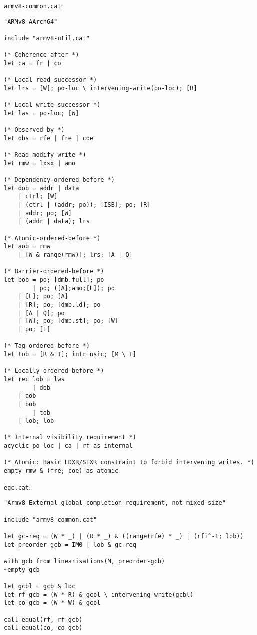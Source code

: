 \texttt{armv8-common.cat}:
\begin{verbatim}
"ARMv8 AArch64"

include "armv8-util.cat"

(* Coherence-after *)
let ca = fr | co

(* Local read successor *)
let lrs = [W]; po-loc \ intervening-write(po-loc); [R]

(* Local write successor *)
let lws = po-loc; [W]

(* Observed-by *)
let obs = rfe | fre | coe

(* Read-modify-write *)
let rmw = lxsx | amo

(* Dependency-ordered-before *)
let dob = addr | data
	| ctrl; [W]
	| (ctrl | (addr; po)); [ISB]; po; [R]
	| addr; po; [W]
	| (addr | data); lrs

(* Atomic-ordered-before *)
let aob = rmw
	| [W & range(rmw)]; lrs; [A | Q]

(* Barrier-ordered-before *)
let bob = po; [dmb.full]; po
        | po; ([A];amo;[L]); po
	| [L]; po; [A]
	| [R]; po; [dmb.ld]; po
	| [A | Q]; po
	| [W]; po; [dmb.st]; po; [W]
	| po; [L]

(* Tag-ordered-before *)
let tob = [R & T]; intrinsic; [M \ T]

(* Locally-ordered-before *)
let rec lob = lws
        | dob
	| aob
	| bob
        | tob
	| lob; lob

(* Internal visibility requirement *)
acyclic po-loc | ca | rf as internal

(* Atomic: Basic LDXR/STXR constraint to forbid intervening writes. *)
empty rmw & (fre; coe) as atomic
\end{verbatim}

\texttt{egc.cat}:
\begin{verbatim}
"Armv8 External global completion requirement, not mixed-size"

include "armv8-common.cat"

let gc-req = (W * _) | (R * _) & ((range(rfe) * _) | (rfi^-1; lob))
let preorder-gcb = IM0 | lob & gc-req

with gcb from linearisations(M, preorder-gcb)
~empty gcb

let gcbl = gcb & loc
let rf-gcb = (W * R) & gcbl \ intervening-write(gcbl)
let co-gcb = (W * W) & gcbl

call equal(rf, rf-gcb)
call equal(co, co-gcb)
\end{verbatim}